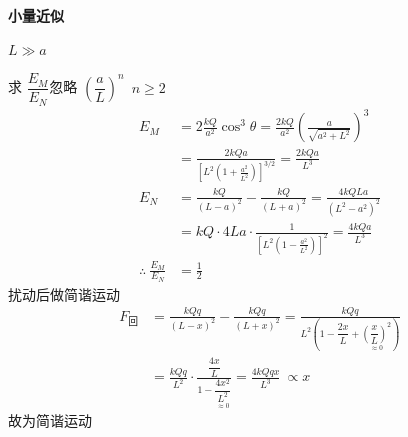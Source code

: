 \textbf{小量近似}

$L\gg a$

求 $\dfrac{E_{M}}{E_{N}}$\quad 忽略 $\left(\dfrac{a}{L}\right)^{n}$\ $n\ge 2$
\begin{align*}
E_{M}&=2\frac{kQ}{a^{2}}\cos^{3}\theta=\frac{2kQ}{a^{2}}\left(\frac{a}{\sqrt{a^{2}+L^{2}}}\right)^{3}\\
&=\frac{2kQa}{\left[L^{2}\left(1+\frac{a^{2}}{L^{2}}\right)\right]^{3/2}}=\frac{2kQa}{L^{3}}\\
E_{N}&=\frac{kQ}{(L-a)^{2}}-\frac{kQ}{(L+a)^{2}}=\frac{4kQLa}{(L^{2}-a^{2})^{2}}\\
&=kQ\cdot4La\cdot\frac{1}{\left[L^{2}\left(1-\frac{a^{2}}{L^{2}}\right)\right]^{2}}=\frac{4kQa}{L^{3}}\\
\therefore\ \frac{E_{M}}{E_{N}}&=\frac{1}{2}
\end{align*}
扰动后做简谐运动
\begin{align*}
F_{\text{回}}&=\frac{kQq}{(L-x)^{2}}-\frac{kQq}{(L+x)^{2}}
=\frac{kQq}{L^{2}\left(1-\dfrac{2x}{L}+\underset{\approx0}{\left(\dfrac{x}{L}\right)^{2}}\right)}\\
&=\frac{kQq}{L^{2}}\cdot\frac{\dfrac{4x}{L}}{1-\underset{\approx0}{\dfrac{4x^{2}}{L^{2}}}}=\frac{4kQqx}{L^{3}}\ \propto x
\end{align*}
故为简谐运动

